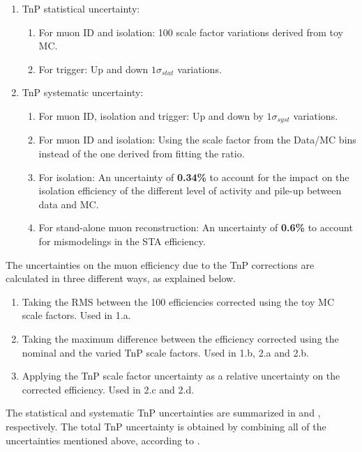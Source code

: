 \begin{enumerate}
   \item TnP statistical uncertainty:
   \begin{enumerate}
      \item For muon ID and isolation: 100 scale factor variations derived from toy MC.
      \item For trigger: Up and down $1 \sigma_{stat}$ variations.
   \end{enumerate}
   \item TnP systematic uncertainty:
   \begin{enumerate}
      \item For muon ID, isolation and trigger: Up and down by $1 \sigma_{syst}$ variations.
      \item For muon ID and isolation: Using the scale factor from the Data/MC bins instead of the one derived from fitting the ratio.
      \item For isolation: An uncertainty of {\bf 0.34\%} to account for the impact on the isolation efficiency of the different level of activity and pile-up between data and MC.
      \item For stand-alone muon reconstruction: An uncertainty of {\bf 0.6\%} to account for mismodelings in the STA efficiency.
   \end{enumerate}
\end{enumerate}


The uncertainties on the muon efficiency due to the TnP corrections are calculated in three different ways, as explained below.

\begin{enumerate}
   \item Taking the RMS between the 100 efficiencies corrected using the toy MC scale factors. Used in 1.a.
   \item Taking the maximum difference between the efficiency corrected using the nominal and the varied TnP scale factors. Used in 1.b, 2.a and 2.b.
   \item Applying the TnP scale factor uncertainty as a relative uncertainty on the corrected efficiency. Used in 2.c and 2.d.
\end{enumerate}

The statistical and systematic TnP uncertainties are summarized in  and , respectively. The total TnP uncertainty is obtained by combining all of the uncertainties mentioned above, according to .

